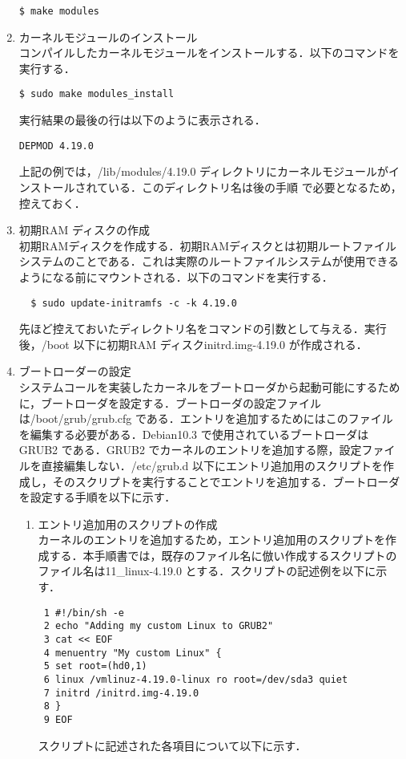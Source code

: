 \documentclass[12pt]{jsarticle}
\begin{document}
\begin{enumerate}
\begin{verbatim}
$ make modules
\end{verbatim}
\item カーネルモジュールのインストール\\
  コンパイルしたカーネルモジュールをインストールする．以下のコマンドを実行する．
\begin{verbatim}
$ sudo make modules_install
\end{verbatim}
実行結果の最後の行は以下のように表示される．
\begin{verbatim}
DEPMOD 4.19.0
\end{verbatim}
上記の例では，/lib/modules/4.19.0 ディレクトリにカーネルモジュールがインストールされている．このディレクトリ名は後の手順 で必要となるため，控えておく．
\item 初期RAM ディスクの作成\\
  初期RAMディスクを作成する．初期RAMディスクとは初期ルートファイルシステムのことである．これは実際のルートファイルシステムが使用できるようになる前にマウントされる．以下のコマンドを実行する．
\begin{verbatim}
  $ sudo update-initramfs -c -k 4.19.0
\end{verbatim}
先ほど控えておいたディレクトリ名をコマンドの引数として与える．実行後，/boot 以下に初期RAM ディスクinitrd.img-4.19.0 が作成される．
\item ブートローダーの設定\\
  システムコールを実装したカーネルをブートローダから起動可能にするために，ブートローダを設定する．ブートローダの設定ファイルは/boot/grub/grub.cfg である．エントリを追加するためにはこのファイルを編集する必要がある．Debian10.3 で使用されているブートローダはGRUB2 である．GRUB2 でカーネルのエントリを追加する際，設定ファイルを直接編集しない．/etc/grub.d 以下にエントリ追加用のスクリプトを作成し，そのスクリプトを実行することでエントリを追加する．ブートローダを設定する手順を以下に示す．
\begin{enumerate}
\item エントリ追加用のスクリプトの作成\\\label{sec:script}
  カーネルのエントリを追加するため，エントリ追加用のスクリプトを作成する．本手順書では，既存のファイル名に倣い作成するスクリプトのファイル名は11\_linux-4.19.0 とする．スクリプトの記述例を以下に示す．
\begin{verbatim}
 1 #!/bin/sh -e
 2 echo "Adding my custom Linux to GRUB2"
 3 cat << EOF
 4 menuentry "My custom Linux" {
 5 set root=(hd0,1)
 6 linux /vmlinuz-4.19.0-linux ro root=/dev/sda3 quiet
 7 initrd /initrd.img-4.19.0
 8 }
 9 EOF
\end{verbatim}
スクリプトに記述された各項目について以下に示す．


\end{enumerate}
\end{enumerate}
\end{document}
